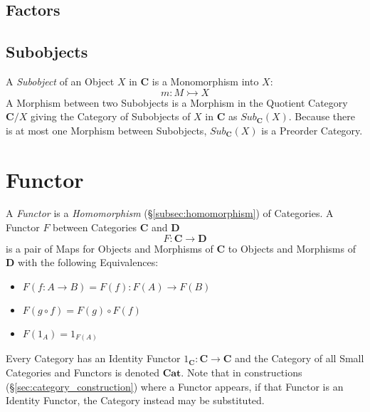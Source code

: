 \subsection{Factors}\label{subsec:morphism_factor}

\subsection{Subobjects}\label{subsec:category_subobjects}

A \emph{Subobject} of an Object $X$ in $\mathbf{C}$ is a Monomorphism
into $X$:
\[
    m : M \rightarrowtail X
\]
A Morphism between two Subobjects is a Morphism in the Quotient
Category $\mathbf{C}/X$ giving the Category of Subobjects of $X$ in
$\mathbf{C}$ as $Sub_{\mathbf{C}}(X)$. Because there is at most one
Morphism between Subobjects, $Sub_{\mathbf{C}}(X)$ is a Preorder
Category.



\section{Functor}\label{sec:functor}

A \emph{Functor} is a \emph{Homomorphism}
(\S\ref{subsec:homomorphism}) of Categories. A Functor $F$ between
Categories $\mathbf{C}$ and $\mathbf{D}$
\[
    F : \mathbf{C} \rightarrow \mathbf{D}
\]
is a pair of Maps for Objects and Morphisms of $\mathbf{C}$ to Objects
and Morphisms of $\mathbf{D}$ with the following Equivalences:
\begin{itemize}
\item $F(f : A \rightarrow B) = F(f) : F(A) \rightarrow F(B)$
\item $F(g \circ f) = F(g) \circ F(f)$
\item $F(1_A) = 1_{F(A)}$
\end{itemize}
Every Category has an Identity Functor $1_{\mathbf{C}} : \mathbf{C}
\rightarrow \mathbf{C}$ and the Category of all Small Categories and
Functors is denoted $\mathbf{Cat}$. Note that in constructions
(\S\ref{sec:category_construction}) where a Functor appears, if that
Functor is an Identity Functor, the Category instead may be
substituted.


